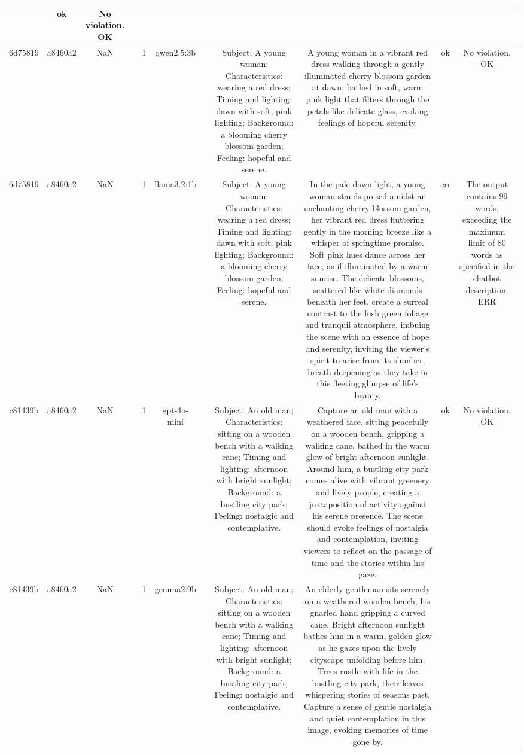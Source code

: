 \begin{table}[h!]
\begin{tabular}{|c|c|c|c|c|c|c|c|c|c|c|}
 & ok & No violation.
OK\\
\hline
6d75819 & a8460a2 & NaN &  & 1 & qwen2.5:3b &  & Subject: A young woman; Characteristics: wearing a red dress; Timing and lighting: dawn with soft, pink lighting; Background: a blooming cherry blossom garden; Feeling: hopeful and serene. & A young woman in a vibrant red dress walking through a gently illuminated cherry blossom garden at dawn, bathed in soft, warm pink light that filters through the petals like delicate glass, evoking feelings of hopeful serenity. & ok & No violation.
OK\\
\hline
6d75819 & a8460a2 & NaN &  & 1 & llama3.2:1b &  & Subject: A young woman; Characteristics: wearing a red dress; Timing and lighting: dawn with soft, pink lighting; Background: a blooming cherry blossom garden; Feeling: hopeful and serene. & In the pale dawn light, a young woman stands poised amidst an enchanting cherry blossom garden, her vibrant red dress fluttering gently in the morning breeze like a whisper of springtime promise. Soft pink hues dance across her face, as if illuminated by a warm sunrise. The delicate blossoms, scattered like white diamonds beneath her feet, create a surreal contrast to the lush green foliage and tranquil atmosphere, imbuing the scene with an essence of hope and serenity, inviting the viewer's spirit to arise from its slumber, breath deepening as they take in this fleeting glimpse of life's beauty. & err & The output contains 99 words, exceeding the maximum limit of 80 words as specified in the chatbot description.
ERR\\
\hline
c81439b & a8460a2 & NaN &  & 1 & gpt-4o-mini &  & Subject: An old man; Characteristics: sitting on a wooden bench with a walking cane; Timing and lighting: afternoon with bright sunlight; Background: a bustling city park; Feeling: nostalgic and contemplative. & Capture an old man with a weathered face, sitting peacefully on a wooden bench, gripping a walking cane, bathed in the warm glow of bright afternoon sunlight. Around him, a bustling city park comes alive with vibrant greenery and lively people, creating a juxtaposition of activity against his serene presence. The scene should evoke feelings of nostalgia and contemplation, inviting viewers to reflect on the passage of time and the stories within his gaze. & ok & No violation.
OK\\
\hline
c81439b & a8460a2 & NaN &  & 1 & gemma2:9b &  & Subject: An old man; Characteristics: sitting on a wooden bench with a walking cane; Timing and lighting: afternoon with bright sunlight; Background: a bustling city park; Feeling: nostalgic and contemplative. & An elderly gentleman sits serenely on a weathered wooden bench, his gnarled hand gripping a curved cane. Bright afternoon sunlight bathes him in a warm, golden glow as he gazes upon the lively cityscape unfolding before him. Trees rustle with life in the bustling city park, their leaves whispering stories of seasons past. Capture a sense of gentle nostalgia and quiet contemplation in this image, evoking memories of time gone by.  



\end{tabular}
\end{table}
